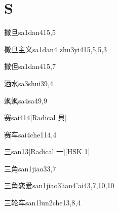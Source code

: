 
\section*{S}

\begin{entry}{撒旦}{sa1dan4}{15,5}
\end{entry}

\begin{entry}{撒旦主义}{sa1dan4 zhu3yi4}{15,5,5,3}
\end{entry}

\begin{entry}{撒但}{sa1dan4}{15,7}
\end{entry}

\begin{entry}{洒水}{sa3shui3}{9,4}
\end{entry}

\begin{entry}{飒飒}{sa4sa4}{9,9}
\end{entry}

\begin{entry}{赛}{sai4}{14}[Radical 貝]
\end{entry}

\begin{entry}{赛车}{sai4che1}{14,4}
\end{entry}

\begin{entry}{三}{san1}{3}[Radical 一][HSK 1]
\end{entry}

\begin{entry}{三角}{san1jiao3}{3,7}
\end{entry}

\begin{entry}{三角恋爱}{san1jiao3lian4'ai4}{3,7,10,10}
\end{entry}

\begin{entry}{三轮车}{san1lun2che1}{3,8,4}
\end{entry}

